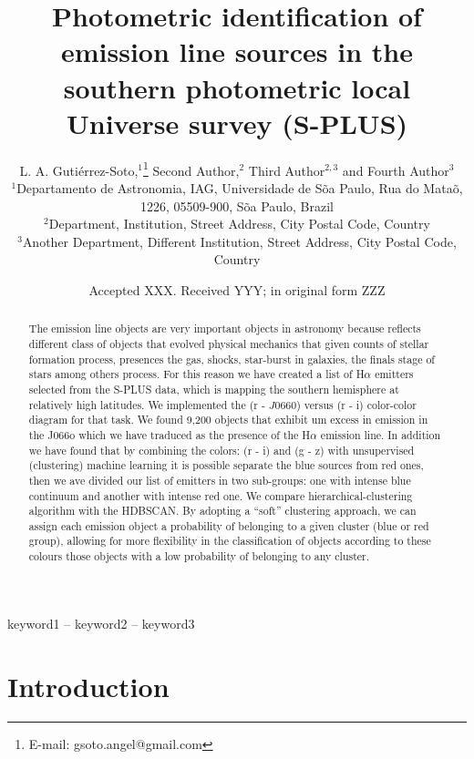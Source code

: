 \documentclass[fleqn,usenatbib]{mnras}
\title[S-PLUS: Emission line objects]{Photometric identification of emission line sources in the southern photometric local Universe survey (S-PLUS)}
\author[Guti\'{e}rrez-Soto et al.]{
L. A. Guti\'{e}rrez-Soto,$^{1}$\thanks{E-mail: gsoto.angel@gmail.com}
Second  Author,$^{2}$
Third Author$^{2,3}$
and Fourth Author$^{3}$
\\
$^{1}$Departamento de Astronomia, IAG, Universidade de S\~{o}a Paulo, Rua do Mata\~{o}, 1226, 05509-900, S\~{o}a Paulo, Brazil\\
$^{2}$Department, Institution, Street Address, City Postal Code, Country\\
$^{3}$Another Department, Different Institution, Street Address, City Postal Code, Country
}
\date{Accepted XXX. Received YYY; in original form ZZZ}
\begin{document}
\label{firstpage}
\pagerange{\pageref{firstpage}--\pageref{lastpage}}
\maketitle

\begin{abstract}
  The emission line objects are very important objects in astronomy
  because reflects different class of objects that evolved physical
  mechanics that given counts of stellar formation process, presences
  the gas, shocks, star-burst in galaxies, the finals stage of stars
  among others process. For this reason we have created a list of
  H{$\alpha$} emitters selected from the S-PLUS data, which is mapping
  the southern hemisphere at relatively high latitudes. We implemented
  the (r - $J$0660) versus (r - i) color-color diagram for that task.
  We found 9,200 objects that exhibit um excess in emission in the J066o
  which we have traduced as the presence of the H{$\alpha$} emission line.
  In addition we have found that by combining the colors: (r - i) and (g - z)
  with unsupervised (clustering) machine learning it is possible separate
  the blue sources from red ones, then we ave divided our list of emitters
  in two sub-groups: one with intense blue continuum and another with
  intense red one. We compare hierarchical-clustering algorithm with the
  HDBSCAN. By adopting a ``soft'' clustering approach, we can assign
  each emission object a probability of belonging to a given cluster
  (blue or red group), allowing for more flexibility in the classification
  of objects according to these colours those objects with a low probability
  of belonging to any cluster. 
\end{abstract}
\begin{keywords}
keyword1 -- keyword2 -- keyword3
\end{keywords}



\section{Introduction}
\end{document}

